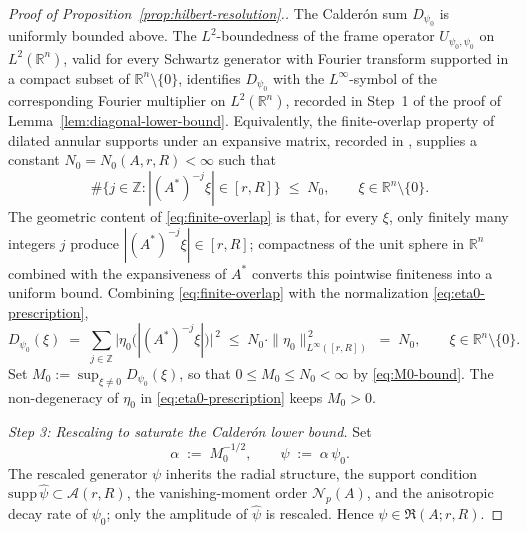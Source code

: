 \documentclass[pdflatex,sn-basic,Numbered]{sn-jnl}
\theoremstyle{thmstyleone}%
\theoremstyle{thmstylethree}%
\begin{document}
\begin{proof}[Proof of Proposition~\ref{prop:hilbert-resolution}.]
	The Calder\'on sum $D_{\psi_0}$ is uniformly bounded above. The
	$L^2$-boundedness of the frame operator $U_{\psi_0, \psi_0}$ on
	$L^2(\mathbb{R}^n)$, valid for every Schwartz generator with
	Fourier transform supported in a compact subset of
	$\mathbb{R}^n \setminus \{0\}$, identifies $D_{\psi_0}$ with the
	$L^\infty$-symbol of the corresponding Fourier multiplier on
	$L^2(\mathbb{R}^n)$, recorded in Step~1 of the proof of
	Lemma~\ref{lem:diagonal-lower-bound}. Equivalently, the
	finite-overlap property of dilated annular supports under an
	expansive matrix, recorded in
	\cite[Lemma~3.6 and its proof]{BownikHo2005}, supplies a constant
	$N_0= N_0(A, r, R) < \infty$ such that
	\begin{equation}\label{eq:finite-overlap}
		\#\bigl\{ j \in \mathbb{Z} : |(A^{*})^{-j} \xi| \in [r, R] \bigr\}
		\;\le\; N_0,
		\qquad \xi \in \mathbb{R}^n \setminus \{0\} .
	\end{equation}
	The geometric content of \eqref{eq:finite-overlap} is that, for
	every $\xi$, only finitely many integers $j$ produce
	$|(A^{*})^{-j} \xi| \in [r, R]$; compactness of the unit sphere in
	$\mathbb{R}^n$ combined with the expansiveness of $A^{*}$ converts
	this pointwise finiteness into a uniform bound. Combining
	\eqref{eq:finite-overlap} with the normalization
	\eqref{eq:eta0-prescription},
	\begin{equation}\label{eq:M0-bound}
		D_{\psi_0}(\xi)
		\;=\; \sum_{j \in \mathbb{Z}}
		\bigl| \eta_0\bigl( |(A^{*})^{-j}\xi| \bigr) \bigr|^{\,2}
		\;\le\; N_0 \cdot \| \eta_0 \|_{L^\infty([r, R])}^{\,2}
		\;=\; N_0,
		\qquad \xi \in \mathbb{R}^n \setminus \{0\} .
	\end{equation}
	Set $M_0 := \sup_{\xi \neq 0} D_{\psi_0}(\xi)$, so that
	$0 \le M_0 \le N_0 < \infty$ by \eqref{eq:M0-bound}. The
	non-degeneracy of $\eta_0$ in \eqref{eq:eta0-prescription} keeps
	$M_0 > 0$.
	
	\medskip
	\emph{Step 3: Rescaling to saturate the Calder\'on lower bound.}
	Set
	\begin{equation}\label{eq:alpha-defn}
		\alpha \;:=\; M_0^{-1/2},
		\qquad
		\psi \;:=\; \alpha\, \psi_0 .
	\end{equation}
	The rescaled generator $\psi$ inherits the radial structure, the
	support condition $\mathrm{supp}\, \widehat{\psi} \subset \mathcal{A}(r, R)$,
	the vanishing-moment order $\mathcal{N}_p(A)$, and the anisotropic
	decay rate of $\psi_0$; only the amplitude of $\widehat{\psi}$ is
	rescaled. Hence $\psi \in \mathfrak{R}(A; r, R)$.
	

\end{proof}
\end{document}
